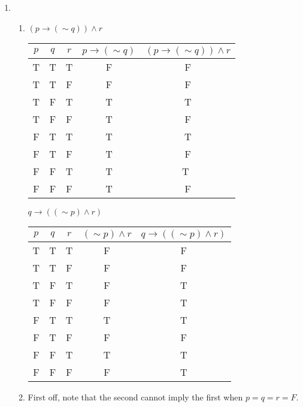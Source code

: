 
\begin{enumerate}
\item
    \begin{enumerate}
    \item 
        $(p \rightarrow (\sim q)) \wedge r$

        \begin{tabular}{c|c|c|c|c}
            $p$ & $q$ & $r$ & $p \rightarrow (\sim q)$ &
                $(p \rightarrow (\sim q)) \wedge r$ \\
            \hline
            T & T & T & F & F \\
            T & T & F & F & F \\
            T & F & T & T & T \\
            T & F & F & T & F \\
            F & T & T & T & T \\
            F & T & F & T & F \\
            F & F & T & T & T\ \\
            F & F & F & T & F \\
        \end{tabular}

        \vspace{3mm}

        $q \rightarrow ((\sim p) \wedge r)$

        \begin{tabular}{c|c|c|c|c}
            $p$ & $q$ & $r$ & $(\sim p) \wedge r$ &
                $q \rightarrow ((\sim p) \wedge r)$ \\
            \hline
            T & T & T & F & F \\
            T & T & F & F & F \\
            T & F & T & F & T \\
            T & F & F & F & T \\
            F & T & T & T & T \\
            F & T & F & F & F \\
            F & F & T & T & T \\
            F & F & F & F & T \\
        \end{tabular}

    \item
        First off, note that the second cannot imply the first when
        $p = q = r = F$.


\end{enumerate}
\end{enumerate}

